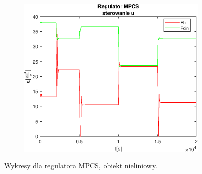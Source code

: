 \begin{figure}[h!]
   \begin{subfigure}[b]{0.4\textwidth}
      \includegraphics[width=1\linewidth]{img/MPCSanaLin/MPCSLinControlN300Nu100l10.eps}
      \caption{}
      \label{fig:fig:MPCSLinN300Nu100l103}
   \end{subfigure}
       
   \caption{Wykresy dla regulatora MPCS, obiekt nieliniowy.}
   \label{fig:MPCSLinN300Nu100l10}
\end{figure}
           
